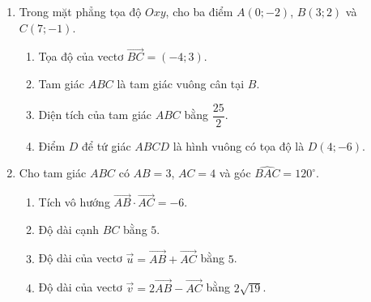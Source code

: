 \documentclass[10pt,a4paper]{article}
\begin{document}
\begin{enumerate}
\item Trong mặt phẳng tọa độ $Oxy$, cho ba điểm $A(0; -2)$, $B(3; 2)$ và $C(7; -1)$.
\begin{enumerate}
    \item Tọa độ của vectơ $\vec{BC} = (-4; 3)$.
    \item Tam giác $ABC$ là tam giác vuông cân tại $B$.
    \item Diện tích của tam giác $ABC$ bằng $\dfrac{25}{2}$.
    \item Điểm $D$ để tứ giác $ABCD$ là hình vuông có tọa độ là $D(4; -6)$.
\end{enumerate}

\item Cho tam giác $ABC$ có $AB = 3$, $AC = 4$ và góc $\widehat{BAC} = 120^\circ$.
\begin{enumerate}
    \item Tích vô hướng $\vec{AB} \cdot \vec{AC} = -6$.
    \item Độ dài cạnh $BC$ bằng $5$.
    \item Độ dài của vectơ $\vec{u} = \vec{AB} + \vec{AC}$ bằng $5$.
    \item Độ dài của vectơ $\vec{v} = 2\vec{AB} - \vec{AC}$ bằng $2\sqrt{19}$.
\end{enumerate}
\end{enumerate}
\end{document}
